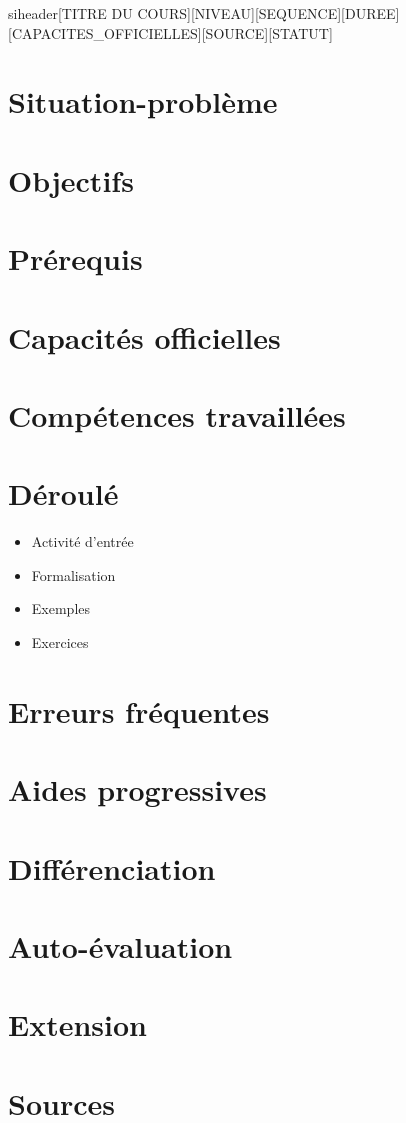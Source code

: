 \documentclass[a4paper,11pt]{article}
\begin{document}
siheader{[TITRE DU COURS]}{[NIVEAU]}{[SEQUENCE]}{[DUREE]}{[CAPACITES\_OFFICIELLES]}{[SOURCE]}{[STATUT]}

\section*{Situation-problème}

\section*{Objectifs}

\section*{Prérequis}

\section*{Capacités officielles}

\section*{Compétences travaillées}

\section*{Déroulé}
\begin{itemize}[nosep]
  \item Activité d'entrée
  \item Formalisation
  \item Exemples
  \item Exercices
\end{itemize}

\section*{Erreurs fréquentes}

\section*{Aides progressives}

\section*{Différenciation}

\section*{Auto-évaluation}

\section*{Extension}

\section*{Sources}
\end{document}
